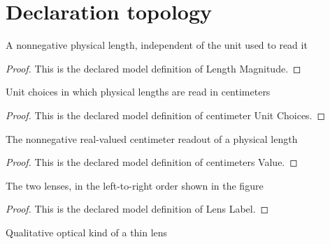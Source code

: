\section{Declaration topology}
\begin{definition}
  \label{def:physics:phyx-mini-0144:phyxminiproblems-problemphyxmini0144-lengthmagnitude}
  A nonnegative physical length, independent of the unit used to read it
\end{definition}
\begin{proof}
  This is the declared model definition of Length Magnitude.
\end{proof}
\begin{definition}
  \label{def:physics:phyx-mini-0144:phyxminiproblems-problemphyxmini0144-centimeterunitchoices}
  Unit choices in which physical lengths are read in centimeters
\end{definition}
\begin{proof}
  This is the declared model definition of centimeter Unit Choices.
\end{proof}
\begin{definition}
  \label{def:physics:phyx-mini-0144:phyxminiproblems-problemphyxmini0144-centimetersvalue}
  The nonnegative real-valued centimeter readout of a physical length
\end{definition}
\begin{proof}
  This is the declared model definition of centimeters Value.
\end{proof}
\begin{definition}
  \label{def:physics:phyx-mini-0144:phyxminiproblems-problemphyxmini0144-lenslabel}
  The two lenses, in the left-to-right order shown in the figure
\end{definition}
\begin{proof}
  This is the declared model definition of Lens Label.
\end{proof}
\begin{definition}
  \label{def:physics:phyx-mini-0144:phyxminiproblems-problemphyxmini0144-thinlenskind}
  Qualitative optical kind of a thin lens
\end{definition}
